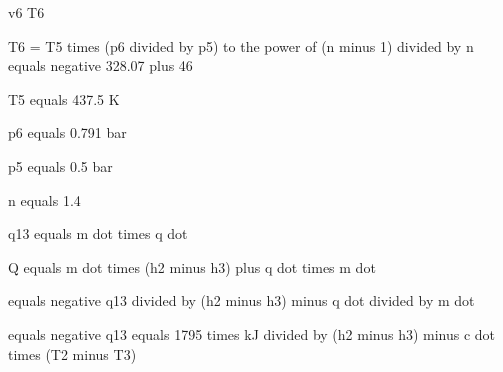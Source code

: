 v6    T6

T6 = T5 times (p6 divided by p5) to the power of (n minus 1) divided by n equals negative 328.07 plus 46

T5 equals 437.5 K

p6 equals 0.791 bar

p5 equals 0.5 bar

n equals 1.4

q13 equals m dot times q dot

Q equals m dot times (h2 minus h3) plus q dot times m dot

equals negative q13 divided by (h2 minus h3) minus q dot divided by m dot

equals negative q13 equals 1795 times kJ divided by (h2 minus h3) minus c dot times (T2 minus T3)